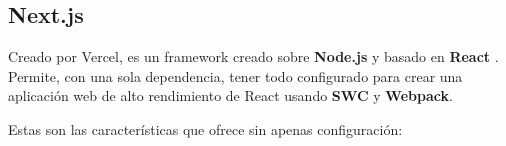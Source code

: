 \documentclass[12pt,twoside,titlepage]{report}
\begin{document}
\subsection{Next.js}
\label{sec:Next}

Creado por Vercel, es un framework creado sobre \textbf{Node.js} y basado en \textbf{React} \cite{nextjs1}.
Permite, con una sola dependencia, tener todo configurado para crear una aplicación web de alto rendimiento de React usando \textbf{SWC} y \textbf{Webpack}. 

Estas son las características \cite{nextjs2} que ofrece sin apenas configuración:
\end{document}
